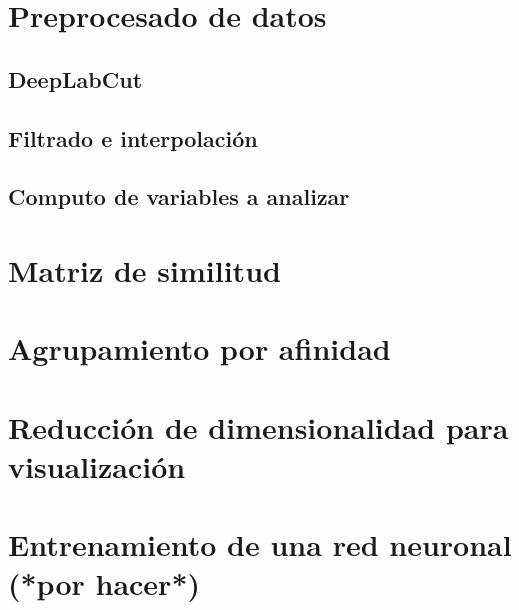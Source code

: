 \section{Preprocesado de datos}

\subsection{DeepLabCut}

\subsection{Filtrado e interpolación}

\subsection{Computo de variables a analizar}

\section{Matriz de similitud}

\section{Agrupamiento por afinidad}

\section{Reducción de dimensionalidad para visualización}

\section{Entrenamiento de una red neuronal (*por hacer*)}


